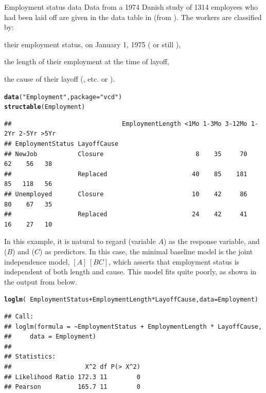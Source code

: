 \documentclass[11pt]{book}\usepackage[]{graphicx}\usepackage[]{color}
\makeatletter
\newcommand{\hlstr}[1]{\textcolor[rgb]{0.192,0.494,0.8}{#1}}%
\newcommand{\hlopt}[1]{\textcolor[rgb]{0,0,0}{#1}}%
\newcommand{\hlstd}[1]{\textcolor[rgb]{0.345,0.345,0.345}{#1}}%
\newcommand{\hlkwc}[1]{\textcolor[rgb]{0.333,0.667,0.333}{#1}}%
\newcommand{\hlkwd}[1]{\textcolor[rgb]{0.737,0.353,0.396}{\textbf{#1}}}%
\newenvironment{kframe}{%
 \def\at@end@of@kframe{}%
 \ifinner\ifhmode%
  \def\at@end@of@kframe{\end{minipage}}%
  \begin{minipage}{\columnwidth}%
 \fi\fi%
 \def\FrameCommand##1{\hskip\@totalleftmargin \hskip-\fboxsep
 \colorbox{shadecolor}{##1}\hskip-\fboxsep
     \hskip-\linewidth \hskip-\@totalleftmargin \hskip\columnwidth}%
 \MakeFramed {\advance\hsize-\width
   \@totalleftmargin\z@ \linewidth\hsize
   \@setminipage}}%
 {\par\unskip\endMakeFramed%
 \at@end@of@kframe}
\newenvironment{knitrout}{}{} %
\renewenvironment{knitrout}{\small\renewcommand{\baselinestretch}{.85}}{} %
\makeatother
\begin{document}
\begin{Example}[employ]{Employment status data}
Data from a 1974 Danish study of 1314 employees who had been laid off
are given in the data table  in 
(from \citet[Table 5.12]{Andersen:91}).
The workers are classified by:
\begin{seriate}
\item their employment status, on January 1, 1975 ( or still ),
\item the length of their employment at the time of layoff,
\item the cause of their layoff (, etc. or ).
\end{seriate}

\begin{knitrout}\footnotesize
{}\color{fgcolor}\begin{kframe}
\begin{alltt}
\hlkwd{data}\hlstd{(}\hlstr{"Employment"}\hlstd{,} \hlkwc{package} \hlstd{=} \hlstr{"vcd"}\hlstd{)}
\hlkwd{structable}\hlstd{(Employment)}
\end{alltt}
\begin{verbatim}
##                              EmploymentLength <1Mo 1-3Mo 3-12Mo 1-2Yr 2-5Yr >5Yr
## EmploymentStatus LayoffCause                                                    
## NewJob           Closure                         8    35     70    62    56   38
##                  Replaced                       40    85    181    85   118   56
## Unemployed       Closure                        10    42     86    80    67   35
##                  Replaced                       24    42     41    16    27   10
\end{verbatim}
\end{kframe}
\end{knitrout}


In this example, it is natural to regard  (variable $A$)
as the response variable,
and  ($B$) and  ($C$) as predictors. 
In this case, the minimal baseline model is the joint independence model,
\([A] \,  [BC] \), which asserts that  employment status is independent of both
length and cause.
This model fits quite poorly, as shown in the output from  below.
\begin{knitrout}
\color{fgcolor}\begin{kframe}
\begin{alltt}
\hlkwd{loglm}\hlstd{(}\hlopt{~} \hlstd{EmploymentStatus} \hlopt{+} \hlstd{EmploymentLength}\hlopt{*}\hlstd{LayoffCause,} \hlkwc{data}\hlstd{=Employment)}
\end{alltt}
\begin{verbatim}
## Call:
## loglm(formula = ~EmploymentStatus + EmploymentLength * LayoffCause, 
##     data = Employment)
## 
## Statistics:
##                    X^2 df P(> X^2)
## Likelihood Ratio 172.3 11        0
## Pearson          165.7 11        0
\end{verbatim}
\end{kframe}
\end{knitrout}



\end{Example}
\end{document}
